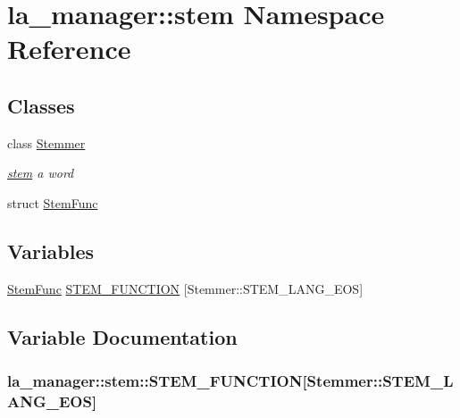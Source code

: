 \hypertarget{namespacela__manager_1_1stem}{
\section{la\_\-manager::stem Namespace Reference}
\label{namespacela__manager_1_1stem}
}
\subsection*{Classes}
\begin{CompactItemize}
\item 
class \hyperlink{classla__manager_1_1stem_1_1Stemmer}{Stemmer}
\begin{CompactList}\small\item\em \hyperlink{namespacela__manager_1_1stem}{stem} a word \item\end{CompactList}\item 
struct \hyperlink{structla__manager_1_1stem_1_1StemFunc}{StemFunc}
\end{CompactItemize}
\subsection*{Variables}
\begin{CompactItemize}
\item 
\hyperlink{structla__manager_1_1stem_1_1StemFunc}{StemFunc} \hyperlink{namespacela__manager_1_1stem_702720be8a4613f6758ad48978e1413d}{STEM\_\-FUNCTION} \mbox{[}Stemmer::STEM\_\-LANG\_\-EOS\mbox{]}
\end{CompactItemize}


\subsection{Variable Documentation}
\hypertarget{namespacela__manager_1_1stem_702720be8a4613f6758ad48978e1413d}{
\subsubsection[{STEM\_\-FUNCTION}]{ {\bf la\_\-manager::stem::STEM\_\-FUNCTION}\mbox{[}Stemmer::STEM\_\-LANG\_\-EOS\mbox{]}}}
\label{namespacela__manager_1_1stem_702720be8a4613f6758ad48978e1413d}


